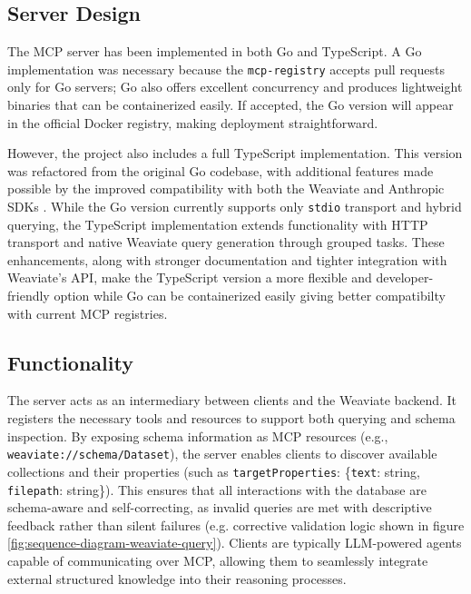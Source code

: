 \subsection{Server Design}

The MCP server has been implemented in both Go and TypeScript. A Go implementation was necessary because the \texttt{mcp-registry} accepts pull requests only for Go servers; Go also offers excellent concurrency and produces lightweight binaries that can be containerized easily. If accepted, the Go version will appear in the official Docker registry, making deployment straightforward.

However, the project also includes a full TypeScript implementation. This version was refactored from the original Go codebase, with additional features made possible by the improved compatibility with both the Weaviate and Anthropic SDKs \cite{stainless_mcp_comparison}. While the Go version currently supports only \texttt{stdio} transport and hybrid querying, the TypeScript implementation extends functionality with HTTP transport and native Weaviate query generation through grouped tasks. These enhancements, along with stronger documentation and tighter integration with Weaviate’s API, make the TypeScript version a more flexible and developer-friendly option while Go can be containerized easily giving better compatibilty with current \ac{MCP} registries.
\subsection{Functionality}
The server acts as an intermediary between clients and the Weaviate backend. It registers the necessary tools and resources to support both querying and schema inspection. By exposing schema information as MCP resources (e.g., \texttt{weaviate://schema/Dataset}), the server enables clients to discover available collections and their properties (such as \texttt{targetProperties}: \{\texttt{text}: string, \texttt{filepath}: string\}). This ensures that all interactions with the database are schema-aware and self-correcting, as invalid queries are met with descriptive feedback rather than silent failures (e.g. corrective validation logic shown in figure \ref{fig:sequence-diagram-weaviate-query}). Clients are typically \ac{LLM}-powered agents capable of communicating over \ac{MCP}, allowing them to seamlessly integrate external structured knowledge into their reasoning processes.


